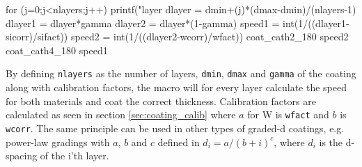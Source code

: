 \begin{verbcode}
  for (j=0;j<nlayers;j++){
    printf("\nStarting layer %
    dlayer = dmin+(j)*(dmax-dmin)/(nlayers-1)
    dlayer1 = dlayer*gamma
    dlayer2 = dlayer*(1-gamma)
    speed1 = int(1/((dlayer1-sicorr)/sifact))
    speed2 = int(1/((dlayer2-wcorr)/wfact))
    coat_cath2_180 speed2
    coat_cath4_180 speed1
    }
\end{verbcode}

By defining \verb|nlayers| as the number of layers, \verb|dmin|, \verb|dmax| and \verb|gamma| of the coating along with calibration factors, the macro will for every layer calculate the speed for both materials and coat the correct thickness. Calibration factors are calculated as seen in section \ref{sec:coating_calib} where $a$ for W is \verb|wfact| and $b$ is \verb|wcorr|. The same principle can be used in other types of graded-d coatings, e.g. power-law gradings with $a$, $b$ and $c$ defined in $d_i = a/(b+i)^c$, where $d_i$ is the d-spacing of the i'th layer.
